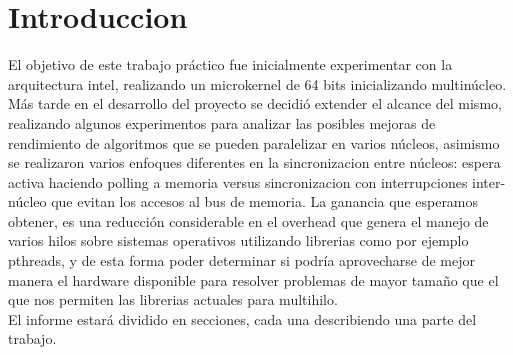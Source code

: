 \section{Introduccion}
    El objetivo de este trabajo práctico fue inicialmente experimentar con la arquitectura intel, realizando un microkernel de 64 bits inicializando multinúcleo. Más tarde en el desarrollo del proyecto se decidió extender el alcance del mismo, realizando algunos experimentos para analizar las posibles mejoras de rendimiento de algoritmos que se pueden paralelizar en varios núcleos, asimismo se realizaron varios enfoques diferentes en la sincronizacion entre núcleos: espera activa haciendo polling a memoria versus sincronizacion con interrupciones inter-núcleo que evitan los accesos al bus de memoria. La ganancia que esperamos obtener, es una reducción considerable en el overhead que genera el manejo de varios hilos sobre sistemas operativos utilizando librerias como por ejemplo pthreads, y de esta forma poder determinar si podría aprovecharse de mejor manera el hardware disponible para resolver problemas de mayor tamaño que el que nos permiten las librerias actuales para multihilo.
    \\

    El informe estará dividido en secciones, cada una describiendo una parte del trabajo.
